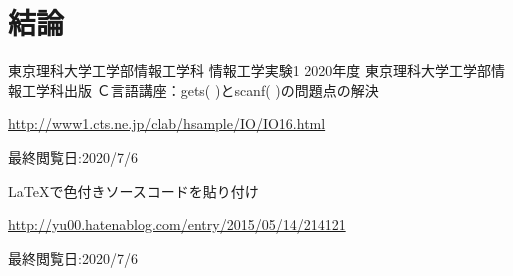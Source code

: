 \documentclass[12pt]{jarticle}
\begin{document}
\section{結論}

\begin{thebibliography}{99}
    \label{sannkoubunnkenn_chapter}
    東京理科大学工学部情報工学科 情報工学実験1 2020年度
    東京理科大学工学部情報工学科出版
    Ｃ言語講座：gets( )とscanf( )の問題点の解決

    \url{http://www1.cts.ne.jp/clab/hsample/IO/IO16.html}

    最終閲覧日:2020/7/6

    LaTeXで色付きソースコードを貼り付け

    \url{http://yu00.hatenablog.com/entry/2015/05/14/214121}

    最終閲覧日:2020/7/6

\end{thebibliography}

\clearpage
\appendix
\end{document}
